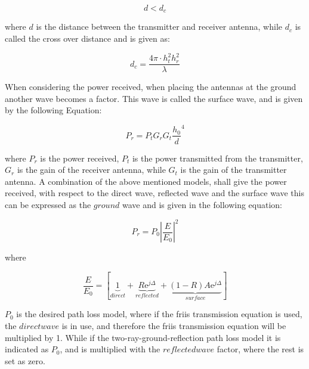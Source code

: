 
\begin{equation}
d < d_{c}
\label{two_ray_cond}
\end{equation}

where $d$ is the distance between the transmitter and receiver antenna, while $d_{c}$ is called the cross over distance and is given as:

\begin{equation}
d_{c} = \frac{4\pi \cdot h^2_t h^2_r }{\lambda}
\label{two_ray_cross_dis}
\end{equation}  

When considering the power received, when placing the antennas at the ground another wave becomes a factor. This wave is called the surface wave, and is given by the following Equation:

\begin{equation}
P_r=P_tG_rG_t\frac{h_0}{d}^4
\label{surface_wave}
\end{equation}

where $P_{r}$ is the power received, $P_{t}$ is the power transmitted from the transmitter, $G_{r}$ is the gain of the receiver antenna, while $G_{t}$ is the gain of the transmitter antenna. A combination of the above mentioned models, shall give the power received, with respect to the direct wave, reflected wave and the surface wave this can be expressed as the $ground$ wave and is given in the following equation:


\begin{equation}
P_r=P_0 \left|\frac{E}{E_0}\right|^2 
\label{ground_wave}
\end{equation}

where

\begin{equation}
\frac{E}{E_{0}}=[\underbrace{1}_{direct}+\underbrace{R\text{e}^{j\Delta}}_{reflected}+\underbrace{(1-R)A\text{e}^{j\Delta}}_{surface}]
\end{equation}

$P_{0}$ is the desired path loss model, where if the friis transmission equation is used, the $direct wave$ is in use, and therefore the friis transmission equation will be multiplied by 1. While if the two-ray-ground-reflection path loss model it is indicated as $P_{0}$, and is multiplied with the $reflected wave$ factor, where the rest is set as zero. 





